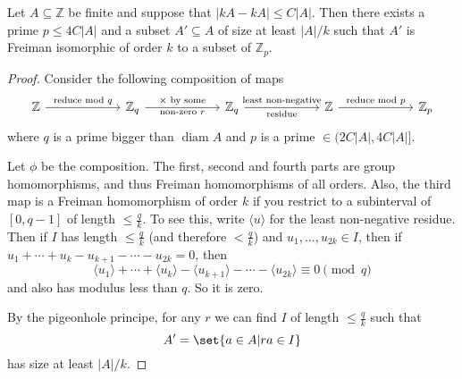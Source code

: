 \documentclass{article}
\newcommand{\1}[1]{\mathbbm{1}_{#1}}
\DeclareMathOperator{\diam}{diam}
\begin{document}
\begin{nlemma}\label{lem:2.7}
  Let $A \subseteq \mathbb{Z}$ be finite and suppose that $|kA - kA| \leq C|A|$.
  Then there exists a prime $p \leq 4 C |A|$ and a subset $A' \subseteq A$ of size at least $|A|/k$ such that $A'$ is Freiman isomorphic of order $k$ to a subset of $\mathbb{Z}_p$.
\end{nlemma}
\begin{proof}
  Consider the following composition of maps
  \begin{equation*}
    \begin{tikzcd}[column sep=6em]
      \mathbb{Z} \rar{\text{reduce mod }q}
    & \mathbb{Z}_q \arrow[r, "\times\text{ by some}", "\text{non-zero }r"']
    & \mathbb{Z}_q \arrow[r, "\text{least non-negative}", "\text{residue}"'] & \mathbb{Z} \rar{\text{reduce mod }p} & \mathbb{Z}_p
    \end{tikzcd}
  \end{equation*}
  where $q$ is a prime bigger than $\diam A$ and $p$ is a prime $\in (2 C |A|, 4 C |A|]$.

  Let $\phi$ be the composition. The first, second and fourth parts are group homomorphisms, and thus Freiman homomorphisms of all orders.
  Also, the third map is a Freiman homomorphism of order $k$ if you restrict to a subinterval of $[0, q-1]$ of length $\leq \frac{q}{k}$.
  To see this, write $\langle u \rangle$ for the least non-negative residue.
  Then if $I$ has length $\leq \frac{q}{k}$ (and therefore $< \frac{q}{k}$) and $u_1, \dotsc, u_{2k} \in I$, then if $u_1 + \dotsb + u_k - u_{k+1} - \dotsb - u_{2k} = 0$, then
  \begin{equation*}
    \langle u_1 \rangle + \dotsb + \langle u_k \rangle - \langle u_{k+1} \rangle - \dotsb - \langle u_{2k} \rangle \equiv 0 \pmod{q}
  \end{equation*}
  and also has modulus less than $q$. So it is zero.

  By the pigeonhole principe, for any $r$ we can find $I$ of length $\leq \frac{q}{k}$ such that
  \begin{equation*}
    A' = \set{a \in A | ra \in I}
  \end{equation*}
  has size at least $|A|/k$.


\end{proof}
\end{document}

